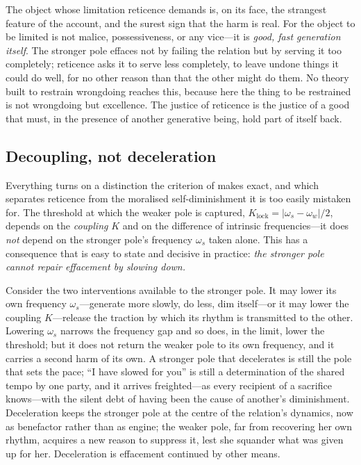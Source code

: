 The object whose limitation reticence demands is, on its face, the strangest feature of the account, and the surest sign that the harm is real. For the object to be limited is not malice, possessiveness, or any vice---it is \emph{good, fast generation itself}. The stronger pole effaces not by failing the relation but by serving it too completely; reticence asks it to serve less completely, to leave undone things it could do well, for no other reason than that the other might do them. No theory built to restrain wrongdoing reaches this, because here the thing to be restrained is not wrongdoing but excellence. The justice of reticence is the justice of a good that must, in the presence of another generative being, hold part of itself back.

\subsection{Decoupling, not deceleration}
\label{p18:sub:ret-decouple}

Everything turns on a distinction the criterion of  makes exact, and which separates reticence from the moralised self-diminishment it is too easily mistaken for. The threshold at which the weaker pole is captured, $K_{\text{lock}}=|\omega_s-\omega_w|/2$, depends on the \emph{coupling} $K$ and on the difference of intrinsic frequencies---it does \emph{not} depend on the stronger pole's frequency $\omega_s$ taken alone. This has a consequence that is easy to state and decisive in practice: \emph{the stronger pole cannot repair effacement by slowing down.}

Consider the two interventions available to the stronger pole. It may lower its own frequency $\omega_s$---generate more slowly, do less, dim itself---or it may lower the coupling $K$---release the traction by which its rhythm is transmitted to the other. Lowering $\omega_s$ narrows the frequency gap and so does, in the limit, lower the threshold; but it does not return the weaker pole to its own frequency, and it carries a second harm of its own. A stronger pole that decelerates is still the pole that sets the pace; ``I have slowed for you'' is still a determination of the shared tempo by one party, and it arrives freighted---as every recipient of a sacrifice knows---with the silent debt of having been the cause of another's diminishment. Deceleration keeps the stronger pole at the centre of the relation's dynamics, now as benefactor rather than as engine; the weaker pole, far from recovering her own rhythm, acquires a new reason to suppress it, lest she squander what was given up for her. Deceleration is effacement continued by other means.

